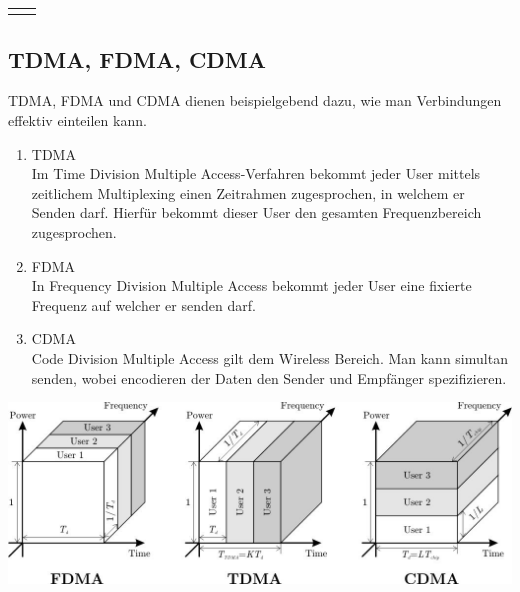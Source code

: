 \documentclass{article}
\begin{document}
\begin{center}
\begin{tabular}{c|c}
\begin{minipage}{0.3\textwidth}
        \end{minipage}
    \end{tabular}
    \end{center}

    \subsection{TDMA, FDMA, CDMA}
    TDMA, FDMA und CDMA dienen beispielgebend dazu, wie man Verbindungen effektiv einteilen kann.
    \begin{enumerate}
        \item TDMA\\
        Im Time Division Multiple Access-Verfahren bekommt jeder User mittels zeitlichem Multiplexing einen Zeitrahmen zugesprochen, in welchem er Senden darf. Hierfür bekommt dieser User den gesamten Frequenzbereich zugesprochen.
        \item FDMA\\
        In Frequency Division Multiple Access bekommt jeder User eine fixierte Frequenz auf welcher er senden darf.
        \item CDMA\\
        Code Division Multiple Access gilt dem Wireless Bereich. Man kann simultan senden, wobei encodieren der Daten den Sender und Empfänger spezifizieren.
    \end{enumerate}
    \begin{center}
        \includegraphics[width=\textwidth]{TDMACDMAFDMA.jpg}
    \end{center}
    
\end{document}
